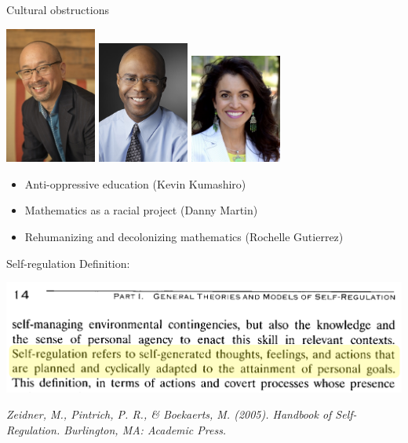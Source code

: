 \documentclass{beamer}
\begin{document}
\begin{frame}{Cultural obstructions}

      \includegraphics[width=3cm]{kumashiro}
      \hfill
      \includegraphics[width=3cm]{danny}
      \hfill
      \includegraphics[width=3cm]{rochelle}

  \begin{itemize}
    \item Anti-oppressive education (Kevin Kumashiro)\pause
    \item Mathematics as a racial project (Danny Martin)\pause
    \item Rehumanizing and decolonizing mathematics (Rochelle Gutierrez)
  \end{itemize}
\end{frame}
\begin{frame}{Self-regulation}
  Definition:
  \begin{center}
    \includegraphics[scale=0.4]{selfregdef}
  \end{center}
  \hfill \begin{minipage}[]{7cm}
      \emph{\tiny Zeidner, M., Pintrich, P. R., \& Boekaerts, M. (2005). Handbook of Self-Regulation. Burlington, MA: Academic Press.}
\end{minipage}
\end{frame}
\end{document}
